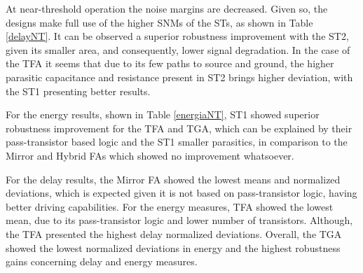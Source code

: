 \documentclass[pgmicro,diss,english]{iiufrgs}
\begin{document}
 At near-threshold operation the noise margins are decreased. Given so, the designs make full use of the higher SNMs of the STs, as shown in Table \ref{delayNT}. It can be observed a superior robustness improvement with the ST2, given its smaller area, and consequently, lower signal degradation. In the case of the TFA it seems that due to its few paths to source and ground, the higher parasitic capacitance and resistance present in ST2 brings higher deviation, with the ST1 presenting better results.

 For the energy results, shown in Table \ref{energiaNT}, ST1 showed superior robustness improvement for the TFA and TGA, which can be explained by their pass-transistor based logic and the ST1 smaller parasitics, in comparison to the Mirror and Hybrid FAs which showed no improvement whatsoever.

 For the delay results, the Mirror FA showed the lowest means and normalized deviations, which is expected given it is not based on pass-transistor logic, having better driving capabilities. For the energy measures, TFA showed the lowest mean, due to its pass-transistor logic and lower number of transistors. Although, the TFA presented the highest delay normalized deviations. Overall, the TGA showed the lowest normalized deviations in energy and the highest robustness gains concerning delay and energy measures.
\end{document}
